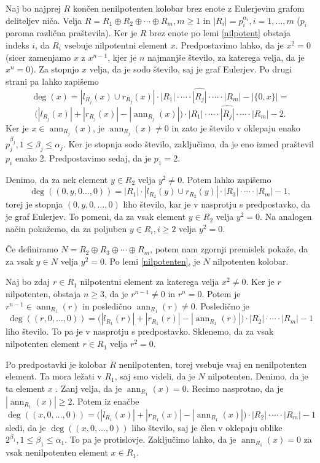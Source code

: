 \documentclass[a4paper, 12pt]{amsart}
\theoremstyle{definition} %
\theoremstyle{plain} %
\DeclareMathOperator{\ann}{ann}
\begin{document}
\proof
Naj bo najprej $R$ končen nenilpotenten kolobar brez enote z Eulerjevim grafom deliteljev niča. Velja $R=R_1\oplus R_2\oplus \cdots \oplus R_m, m\ge 1$ in $|R_i|=p_i^{\alpha_i}, i=1,\dots,m$ ($p_i$ paroma različna praštevila). Ker je $R$ brez enote po lemi \ref{nilpotent} obstaja indeks $i$, da $R_i$ vsebuje nilpotentni element $x$. Predpostavimo lahko, da je $x^2 = 0$ (sicer zamenjamo $x$ z $x^{n-1}$, kjer je $n$ najmanjše število, za katerega velja, da je $x^n=0$). Za stopnjo $x$ velja, da je sodo število, saj je graf Eulerjev. Po  drugi  strani pa lahko zapišemo 
$$
\deg(x) = |l_{R_j}(x) \cup r_{R_j}(x)|\cdot |R_1|\cdot \cdots \cdot \widehat{|R_j|} \cdot \cdots \cdot |R_m| - |\{0,x\}| = 
$$
$$
\big( |l_{R_j}(x)| + |r_{R_j}(x)| - |\ann_{R_j}(x)| \big)\cdot |R_1| \cdot \cdots \cdot \widehat{|R_j|} \cdot \cdots \cdot |R_m| - 2.
$$
Ker je $x\in \ann_{R_j}(x)$, je $\ann_{R_j}(x)\neq 0$ in zato je število v oklepaju enako $p_j^{\beta_j}, 1\le \beta_j \le \alpha_j$. Ker je stopnja sodo število, zaključimo, da je eno izmed praštevil $p_i$ enako 2. Predpostavimo sedaj, da je $p_1 = 2$.

Denimo, da za nek element $y\in R_2$ velja $y^2 \neq 0$. Potem lahko zapišemo
$$
\deg((0,y,0\dots,0)) =  |R_1|\cdot |l_{R_2}(y)\cup r_{R_2}(y)|\cdot |R_3| \cdot \cdots \cdot |R_m| - 1,
$$
torej je stopnja $(0,y,0,\dots,0)$ liho število, kar je v nasprotju s predpostavko, da je graf Eulerjev. To pomeni, da za vsak element $y\in R_2$ velja $y^2 = 0$. Na analogen način pokažemo, da za poljuben $y\in R_i, i\ge 2$ velja $y^2 = 0$. 

Če definiramo $N=R_2 \oplus R_3 \oplus \cdots \oplus R_m$, potem nam zgornji premislek pokaže, da za vsak $y \in N$ velja $y^2 = 0$. Po lemi \ref{nilpotenten}, je $N$ nilpotenten kolobar.

Naj bo zdaj $r\in R_1$ nilpotentni element za katerega velja $x^2  \neq 0$. Ker je $r$ nilpotenten, obstaja $n\ge 3$, da je $r^{n-1}\neq 0$ in $r^n = 0$. Potem je $r^{n-1}\in \ann_{R_1}(r)$ in posledično $\ann_{R_1}(r) \neq 0$. Posledično je 
$$
\deg((r,0,\dots,0)) = \big( |l_{R_1}(r)| + |r_{R_1}(r)| - |\ann_{R_1}(r)| \big)\cdot |R_2| \cdot \cdots \cdot |R_m| - 1
$$
liho število. To pa je v nasprotju s predpostavko. Sklenemo, da za vsak nilpotenten element $r\in R_1$ velja $r^2=0$.

Po predpostavki je kolobar $R$ nenilpotenten, torej vsebuje vsaj en nenilpotenten element. Ta mora ležati v $R_1$, saj smo videli, da je $N$ nilpotenten. Denimo, da je ta element $x$ . Zanj velja, da je $\ann_{R_1}(x) = 0$. Recimo nasprotno, da je $|\ann_{R_1}(x)|\ge 2$. Potem iz enačbe 
$$
\deg ((x,0,\dots,0)) = \big( |l_{R_1}(x) | + |r_{R_1}(x)| - |\ann_{R_1}(x)| \big) \cdot |R_2| \cdot \cdots \cdot |R_m| - 1
$$
sledi, da je $\deg((x,0,\dots,0))$ liho število, saj je člen v oklepaju oblike $2^{\beta_1}, 1\le \beta_1 \le \alpha_1$. To pa je protislovje. Zaključimo lahko, da je $\ann_{R_1}(x) = 0$ za vsak nenilpotenten element $x\in R_1$.
\end{document}
